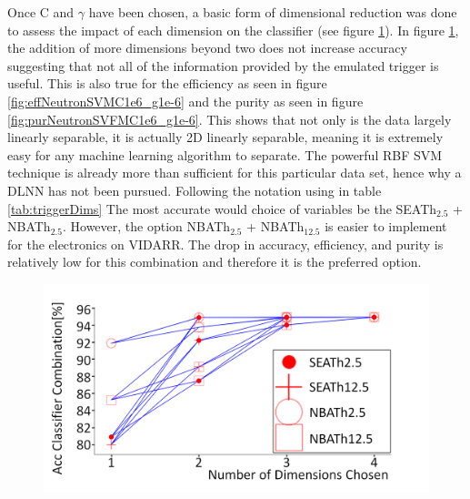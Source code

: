 Once C and $\gamma$ have been chosen, a basic form of dimensional reduction was done to assess the impact of each dimension on the classifier (see figure \ref{fig:accNeutronSVMC1e6_g1e-6}). In figure \ref{fig:accNeutronSVMC1e6_g1e-6}, the addition of more dimensions beyond two does not increase accuracy suggesting that not all of the information provided by the emulated trigger is useful. This is also true for the efficiency as seen in figure \ref{fig:effNeutronSVMC1e6_g1e-6} and the purity as seen in figure \ref{fig:purNeutronSVFMC1e6_g1e-6}. This shows that not only is the data largely linearly separable, it is actually 2D linearly separable, meaning it is extremely easy for any machine learning algorithm to separate. The powerful RBF SVM technique is already more than sufficient for this particular data set, hence why a DLNN has not been pursued. Following the notation using in table \ref{tab:triggerDims} The most accurate would choice of variables be the SEATh$_{2.5}$ + NBATh$_{2.5}$. However, the option NBATh$_{2.5}$ + NBATh$_{12.5}$ is easier to implement for the electronics on VIDARR. The drop in accuracy, efficiency, and purity is relatively low for this combination and therefore it is the preferred option. 

\begin{figure}[!h]
\centering
\includegraphics[width=0.8\linewidth]{Chapter4/Figs/Raster/accNeutronSVMC1e6_g1e-6MedText.png}
\label{fig:accNeutronSVMC1e6_g1e-6}
\end{figure}

